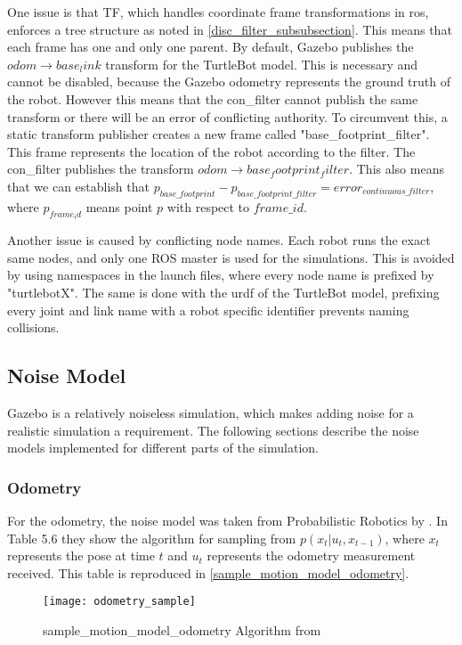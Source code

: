\documentclass[thesis.tex]{subfile}
\begin{document}
One issue is that TF, which handles coordinate frame transformations in \gls{ros}, enforces a tree structure as noted in \autoref{disc_filter_subsubsection}. This means that each frame has one and only one parent. By default, Gazebo publishes the $odom \rightarrow base_link$ transform for the TurtleBot model. This is necessary and cannot be disabled, because the Gazebo odometry represents the ground truth of the robot. However this means that the \gls{con_filter} cannot publish the same transform or there will be an error of conflicting authority. To circumvent this, a static transform publisher creates a new frame called "base\_footprint\_filter". This frame represents the location of the robot according to the filter. The \gls{con_filter} publishes the transform $odom \rightarrow base_footprint_filter$. This also means that we can establish that $p_{base\_footprint} - p_{base\_footprint\_filter} = error_{continuous\_filter}$, where $p_{frame_id}$ means point $p$ with respect to $frame\_id$.

Another issue is caused by conflicting node names. Each robot runs the exact same nodes, and only one ROS master is used for the simulations. This is avoided by using namespaces in the launch files, where every node name is prefixed by "turtlebotX". The same is done with the \gls{urdf} of the TurtleBot model, prefixing every joint and link name with a robot specific identifier prevents naming collisions.

\subsection{Noise Model} \label{sec:noise_model}
Gazebo is a relatively noiseless simulation, which makes adding noise for a realistic simulation a requirement. The following sections describe the noise models implemented for different parts of the simulation.

\subsubsection{Odometry}
For the odometry, the noise model was taken from Probabilistic Robotics by \textcite[136]{ProbabilisticRobotics}. In Table 5.6 they show the algorithm for sampling from $p(x_t | u_t, x_{t-1})$, where $x_t$ represents the pose at time $t$ and $u_t$ represents the odometry measurement received. This table is reproduced in \autoref{sample_motion_model_odometry}.
\begin{figure}
\centering
\texttt{[image: odometry\_sample]}
\caption[sample\_motion\_model\_odometry Algorithm]{sample\_motion\_model\_odometry Algorithm from \cite[136]{ProbabilisticRobotics}}
\label{sample_motion_model_odometry}
\end{figure} 
\end{document}
